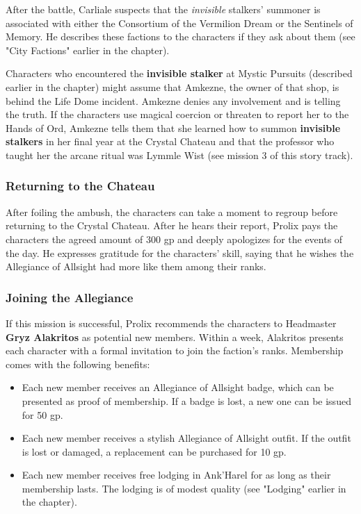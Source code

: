 \documentclass[letterpaper, 11pt, bg=full, twocolumn]{dndbook}
\begin{document}
After the battle, Carliale suspects that the \textit{invisible} stalkers' summoner is associated with either the Consortium of the Vermilion Dream or the Sentinels of Memory. He describes these factions to the characters if they ask about them (see "City Factions" earlier in the chapter).

Characters who encountered the \textbf{invisible stalker} at Mystic Pursuits (described earlier in the chapter) might assume that Amkezne, the owner of that shop, is behind the Life Dome incident. Amkezne denies any involvement and is telling the truth. If the characters use magical coercion or threaten to report her to the Hands of Ord, Amkezne tells them that she learned how to summon \textbf{invisible stalkers} in her final year at the Crystal Chateau and that the professor who taught her the arcane ritual was Lymmle Wist (see mission 3 of this story track).

\subsubsection{Returning to the Chateau}

After foiling the ambush, the characters can take a moment to regroup before returning to the Crystal Chateau. After he hears their report, Prolix pays the characters the agreed amount of 300 gp and deeply apologizes for the events of the day. He expresses gratitude for the characters' skill, saying that he wishes the Allegiance of Allsight had more like them among their ranks.

\subsubsection{Joining the Allegiance}

If this mission is successful, Prolix recommends the characters to Headmaster \textbf{Gryz Alakritos} as potential new members. Within a week, Alakritos presents each character with a formal invitation to join the faction's ranks. Membership comes with the following benefits:

\begin{itemize}
\item Each new member receives an Allegiance of Allsight badge, which can be presented as proof of membership. If a badge is lost, a new one can be issued for 50 gp.
\item Each new member receives a stylish Allegiance of Allsight outfit. If the outfit is lost or damaged, a replacement can be purchased for 10 gp.
\item Each new member receives free lodging in Ank'Harel for as long as their membership lasts. The lodging is of modest quality (see "Lodging" earlier in the chapter).
\end{itemize}
\end{document}
